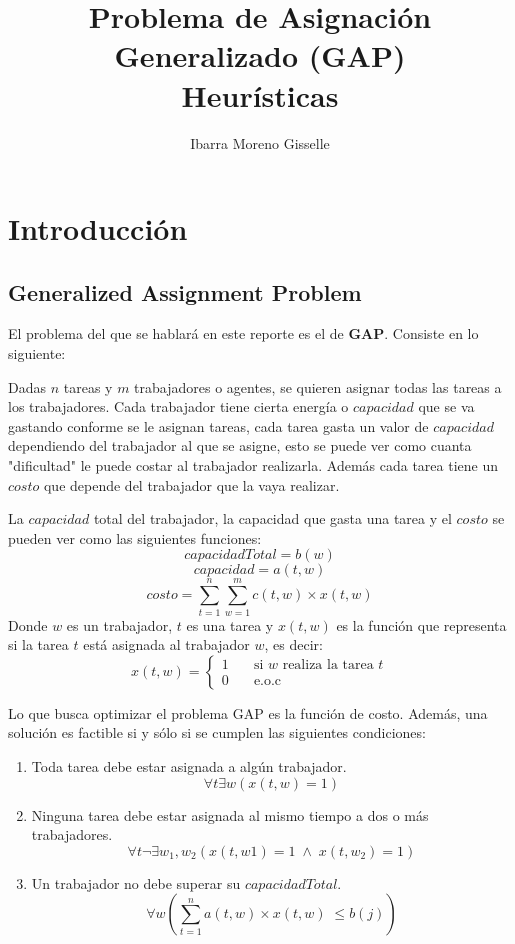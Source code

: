 \documentclass[12pt]{article}
\author{Ibarra Moreno Gisselle }
\title{Problema de Asignación Generalizado (GAP)\\Heurísticas}
\begin{document}
	\maketitle
	
	\section{Introducción}
	\subsection{Generalized Assignment Problem}
	El problema del que se hablará en este reporte es el de \textbf{GAP}. Consiste en lo
	siguiente:
	
	Dadas $n$ tareas y $m$ trabajadores o agentes, se quieren asignar todas las tareas
	a los trabajadores. Cada trabajador tiene cierta energía o $capacidad$ que se va
	gastando conforme se le asignan tareas, cada tarea gasta un valor de $capacidad$
	dependiendo del trabajador al que se asigne, esto se puede ver como cuanta "dificultad" le puede costar al trabajador realizarla.
	Además cada tarea tiene un $costo$ que depende del trabajador que la vaya realizar.
	
	La $capacidad$ total del trabajador, la capacidad que gasta una tarea y el $costo$ 
	se pueden ver como las siguientes funciones:
	\[capacidadTotal=b(w)\]
	\[capacidad=a(t,w)\] 
	\[costo=\sum_{t=1}^{n}\sum_{w=1}^{m}c(t,w)\times x(t,w)\]
	Donde $w$ es un trabajador, $t$ es una tarea y $x(t,w)$ es la función que 
	representa si la tarea $t$ está asignada al trabajador $w$, es decir:
	\[x(t,w)=
	\begin{cases}
		\text{1}&\quad\text{si $w$ realiza la tarea $t$}\\
		\text{0}&\quad\text{e.o.c}
	\end{cases}\]
	
	Lo que busca optimizar el problema GAP es la función de costo.
	Además, una solución es factible si y sólo si se cumplen las siguientes 
	condiciones:
	\begin{enumerate}
		\item Toda tarea debe estar asignada a algún trabajador.
		\[\forall t \exists w (x(t,w)=1)\]
		\item Ninguna tarea debe estar asignada al mismo tiempo a dos o más 
		trabajadores.
		\[\forall t \neg \exists w_1,w_2 (x(t,w1)=1 \;\wedge \; x(t,w_2)=1)\]
		\item Un trabajador no debe superar su $capacidadTotal$.
		\[\forall w \left(\sum_{t=1}^{n}a(t,w)\times x(t,w) \; \leq b(j)\right)\]
	\end{enumerate}
\end{document}

